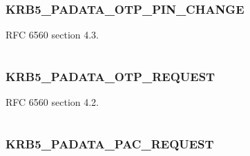 \documentclass[letterpaper,10pt,english]{sphinxmanual}
\begin{document}
\subsubsection{KRB5\_PADATA\_OTP\_PIN\_CHANGE}
\label{appdev/refs/macros/KRB5_PADATA_OTP_PIN_CHANGE::doc}\label{appdev/refs/macros/KRB5_PADATA_OTP_PIN_CHANGE:krb5-padata-otp-pin-change}\label{appdev/refs/macros/KRB5_PADATA_OTP_PIN_CHANGE:krb5-padata-otp-pin-change-data}

\begin{fulllineitems}
\label{appdev/refs/macros/KRB5_PADATA_OTP_PIN_CHANGE:KRB5_PADATA_OTP_PIN_CHANGE}
\end{fulllineitems}


RFC 6560 section 4.3.

\begin{tabulary}{\linewidth}{|L|L|}
\hline

 & 
\\\hline
\end{tabulary}



\subsubsection{KRB5\_PADATA\_OTP\_REQUEST}
\label{appdev/refs/macros/KRB5_PADATA_OTP_REQUEST:krb5-padata-otp-request}\label{appdev/refs/macros/KRB5_PADATA_OTP_REQUEST::doc}\label{appdev/refs/macros/KRB5_PADATA_OTP_REQUEST:krb5-padata-otp-request-data}

\begin{fulllineitems}
\label{appdev/refs/macros/KRB5_PADATA_OTP_REQUEST:KRB5_PADATA_OTP_REQUEST}
\end{fulllineitems}


RFC 6560 section 4.2.

\begin{tabulary}{\linewidth}{|L|L|}
\hline

 & 
\\\hline
\end{tabulary}



\subsubsection{KRB5\_PADATA\_PAC\_REQUEST}
\label{appdev/refs/macros/KRB5_PADATA_PAC_REQUEST:krb5-padata-pac-request-data}\label{appdev/refs/macros/KRB5_PADATA_PAC_REQUEST:krb5-padata-pac-request}\label{appdev/refs/macros/KRB5_PADATA_PAC_REQUEST::doc}
\end{document}
